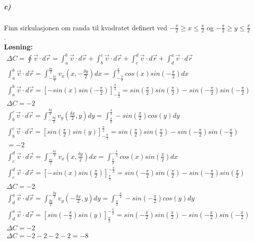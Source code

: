 \documentclass[11pt, A4paper,norsk]{article}
\begin{document}
			\subparagraph{c)}
				\begin{flushleft}
Finn sirkulasjonen om randa til kvadratet definert ved $- \frac{\pi}{2} \geq x \leq  \frac{\pi}{2}$ og $- \frac{\pi}{2} \geq y \leq \frac{\pi}{2}$. \\
\vspace{1mm}
\textbf{Løsning:} \\
\vspace{1mm}
					\begin{align}
\Delta C = \oint \vec{v} \cdot d \vec{r} = \int_{a}^{b} \vec{v} \cdot d\vec{r} + \int_{b}^{c} \vec{v} \cdot d\vec{r} + \int_{c}^{d} \vec{v} \cdot d\vec{r} + \int_{d}^{a} \vec{v} \cdot d\vec{r} \nonumber \\
\int_{a}^{b} \vec{v} \cdot d\vec{r} = \int_{- \frac{\delta x}{2}}^{\frac{\delta x}{2}} v_x(x, -\frac{\delta y}{2}) dx = \int_{-\frac{\pi}{2}}^{\frac{\pi}{2}} cos(x)sin(- \frac{\pi}{2}) dx \nonumber \\
\int_{a}^{b} \vec{v} \cdot d\vec{r} = \left[-sin(x)sin(-\frac{\pi}{2})\right]_{-\frac{\pi}{2}}^{\frac{\pi}{2}} = sin(\frac{\pi}{2})sin(\frac{\pi}{2}) - sin(- \frac{\pi}{2})sin(- \frac{\pi}{2}) \nonumber \\
\Delta C = -2 \nonumber \\
\int_{b}^{c} \vec{v} \cdot d\vec{r} = \int_{-\frac{\delta y}{2}}^{\frac{\delta y}{2}} v_y(\frac{\delta x}{2}, y) dy = \int_{\frac{\pi}{2}}^{\frac{\pi}{2}} -sin(\frac{\pi}{2})cos(y) dy \nonumber \\
\int_{b}^{c} \vec{v} \cdot d\vec{r} = \left[sin(\frac{\pi}{2})sin(y)\right]_{-\frac{\pi}{2}}^{\frac{\pi}{2}} = sin(\frac{\pi}{2})sin(\frac{\pi}{2}) - sin(-\frac{\pi}{2})sin(-\frac{\pi}{2}) \nonumber \\
 = -2 \nonumber \\
\int_{c}^{d} \vec{v} \cdot d\vec{r} = \int_{\frac{\delta x}{2}}^{-\frac{\delta x}{2}} v_x(x, \frac{\delta y}{2}) dx = \int_{\frac{\pi}{2}}^{-\frac{\pi}{2}} cos(x)sin(\frac{\pi}{2}) dx \nonumber \\
\int_{c}^{d} \vec{v} \cdot d\vec{r} = \left[-sin(x)sin(\frac{\pi}{2})\right]_{\frac{\pi}{2}}^{-\frac{\pi}{2}} = sin(-\frac{\pi}{2})sin(\frac{\pi}{2}) - sin(-\frac{\pi}{2})sin(\frac{\pi}{2}) \nonumber \\
\Delta C = -2 \nonumber \\
\int_{d}^{a} \vec{v} \cdot d\vec{r} = \int_{\frac{\delta y}{2}}^{-\frac{\delta y}{2}} v_y(-\frac{\delta x}{2}, y) dy = \int_{\frac{\pi}{2}}^{- \frac{\pi}{2}} -sin(-\frac{\pi}{2})cos(y) dy \nonumber \\
\int_{d}^{a} \vec{v} \cdot d\vec{r} = \left[sin(-\frac{\pi}{2})sin(y)\right]_{\frac{\pi}{2}}^{-\frac{\pi}{2}} = sin(-\frac{\pi}{2})sin(\frac{\pi}{2}) - sin(-\frac{\pi}{2})sin(-\frac{\pi}{2}) \nonumber \\
\Delta C = -2 \nonumber \\
\Delta C = -2-2-2-2 = -8 \nonumber 
					\end{align}
				\end{flushleft}
\end{document}
